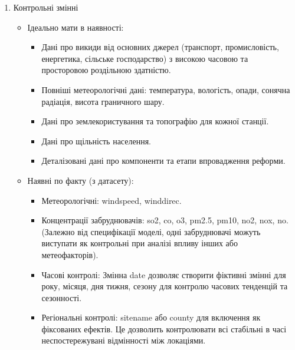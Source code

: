 \documentclass{article}
\begin{document}
\begin{enumerate}
    \item Контрольні змінні
    \begin{itemize}
        \item Ідеально мати в наявності:
        \begin{itemize}
            \item Дані про викиди від основних джерел (транспорт, промисловість, енергетика, сільське господарство) з високою часовою та просторовою роздільною здатністю.
            \item Повніші метеорологічні дані: температура, вологість, опади, сонячна радіація, висота граничного шару.
            \item Дані про землекористування та топографію для кожної станції.
            \item Дані про щільність населення.
            \item Деталізовані дані про компоненти та етапи впровадження реформи.
        \end{itemize}
        \item Наявні по факту (з датасету):
        \begin{itemize}
            \item Метеорологічні: windspeed, winddirec.
            \item Концентрації забруднювачів: so2, co, o3, pm2.5, pm10, no2, nox, no. (Залежно від специфікації моделі, одні забруднювачі можуть виступати як контрольні при аналізі впливу інших або метеофакторів).
            \item Часові контролі: Змінна date дозволяє створити фіктивні змінні для року, місяця, дня тижня, сезону для контролю часових тенденцій та сезонності.
            \item Регіональні контролі: sitename або county для включення як фіксованих ефектів. Це дозволить контролювати всі стабільні в часі неспостережувані відмінності між локаціями.
        \end{itemize}
    \end{itemize}


\end{enumerate}
\end{document}
